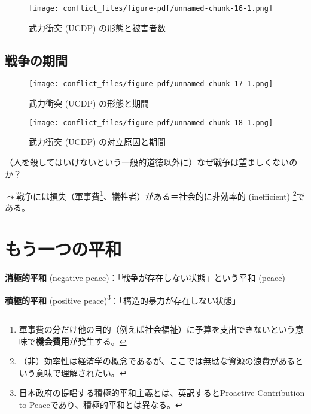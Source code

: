 \documentclass[
  xelatex,
  ja=standard]{bxjsarticle}
\begin{document}
\begin{figure}[htpb]

{\centering \texttt{[image: conflict\_files/figure-pdf/unnamed-chunk-16-1.png]}

}

\caption{武力衝突 (UCDP) の形態と被害者数}

\end{figure}

\hypertarget{ux6226ux4e89ux306eux671fux9593}{%
\subsection{戦争の期間}\label{ux6226ux4e89ux306eux671fux9593}}

\begin{figure}[htpb]

{\centering \texttt{[image: conflict\_files/figure-pdf/unnamed-chunk-17-1.png]}

}

\caption{武力衝突 (UCDP) の形態と期間}

\end{figure}

\begin{figure}[htpb]

{\centering \texttt{[image: conflict\_files/figure-pdf/unnamed-chunk-18-1.png]}

}

\caption{武力衝突 (UCDP) の対立原因と期間}

\end{figure}

（人を殺してはいけないという一般的道徳以外に）なぜ戦争は望ましくないのか？

\(\leadsto\)戦争には損失（軍事費\footnote{軍事費の分だけ他の目的（例えば社会福祉）に予算を支出できないという意味で\textbf{機会費用}が発生する。}、犠牲者）がある＝社会的に非効率的
(inefficient) \footnote{（非）効率性は経済学の概念であるが、ここでは無駄な資源の浪費があるという意味で理解されたい。}である。

\hypertarget{ux3082ux3046ux4e00ux3064ux306eux5e73ux548c}{%
\section{もう一つの平和}\label{ux3082ux3046ux4e00ux3064ux306eux5e73ux548c}}

\textbf{消極的平和} (negative peace)：「戦争が存在しない状態」という平和
(peace)

\textbf{積極的平和} (positive
peace)\footnote{日本政府の提唱する\href{https://www.mofa.go.jp/mofaj/p_pd/dpr/page1w_000072.html}{積極的平和主義}とは、英訳するとProactive
  Contribution to Peaceであり、積極的平和とは異なる。}：「構造的暴力が存在しない状態」
\end{document}
